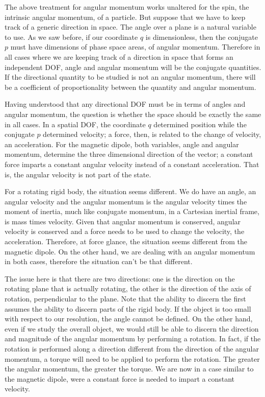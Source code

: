 The above treatment for angular momentum works unaltered for the spin, the intrinsic angular momentum, of a particle. But suppose that we have to keep track of a generic direction in space. The angle over a plane is a natural variable to use. As we saw before, if our coordinate $q$ is dimensionless, then the conjugate $p$ must have dimensions of phase space areas, of angular momentum. Therefore in all cases where we are keeping track of a direction in space that forms an independent DOF, angle and angular momentum will be the conjugate quantities. If the directional quantity to be studied is not an angular momentum, there will be a coefficient of proportionality between the quantity and angular momentum.

Having understood that any directional DOF must be in terms of angles and angular momentum, the question is whether the space should be exactly the same in all cases. In a spatial DOF, the coordinate $q$ determined position while the conjugate $p$ determined velocity; a force, then, is related to the change of velocity, an acceleration. For the magnetic dipole, both variables, angle and angular momentum, determine the three dimensional direction of the vector; a constant force imparts a constant angular velocity instead of a constant acceleration. That is, the angular velocity is not part of the state.

For a rotating rigid body, the situation seems different. We do have an angle, an angular velocity and the angular momentum is the angular velocity times the moment of inertia, much like conjugate momentum, in a Cartesian inertial frame, is mass times velocity. Given that angular momentum is conserved, angular velocity is conserved and a force needs to be used to change the velocity, the acceleration. Therefore, at force glance, the situation seems different from the magnetic dipole. On the other hand, we are dealing with an angular momentum in both cases, therefore the situation can't be that different.

The issue here is that there are two directions: one is the direction on the rotating plane that is actually rotating, the other is the direction of the axis of rotation, perpendicular to the plane. Note that the ability to discern the first assumes the ability to discern parts of the rigid body. If the object is too small with respect to our resolution, the angle cannot be defined. On the other hand, even if we study the overall object, we would still be able to discern the direction and magnitude of the angular momentum by performing a rotation. In fact, if the rotation is performed along a direction different from the direction of the angular momentum, a torque will need to be applied to perform the rotation. The greater the angular momentum, the greater the torque. We are now in a case similar to the magnetic dipole, were a constant force is needed to impart a constant velocity.

